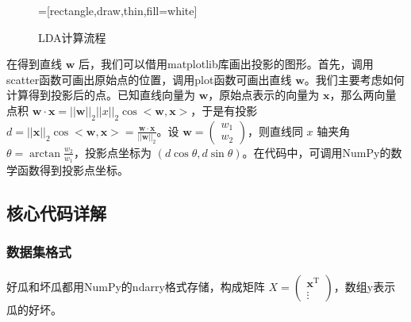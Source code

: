 \documentclass{ctexart}
\begin{document}
	\begin{figure}[htb]
		\centering
		\scriptsize  
		=[rectangle,draw,thin,fill=white]
		\caption{LDA计算流程}
		\label{LDA_Cal}
	\end{figure}  
	
	在得到直线 $\bm{w}$ 后，我们可以借用matplotlib库画出投影的图形。首先，调用scatter函数可画出原始点的位置，调用plot函数可画出直线 $\bm{w}$。我们主要考虑如何计算得到投影后的点。已知直线向量为 $\bm{w}$，原始点表示的向量为 $\bm{x}$，那么两向量点积 $\bm{w}\cdot\bm{x}=||\bm{w}||_2||x||_2\cos<\bm{w},\bm{x}>$，于是有投影 $d=||\bm{x}||_2\cos<\bm{w},\bm{x}>=\frac{\bm{w}\cdot\bm{x}}{||\bm{w}||_2}$。设 $\bm{w}=\begin{pmatrix}w_1\\w_2\end{pmatrix}$，则直线同 $x$ 轴夹角 $\theta=\arctan\frac{w_2}{w_1}$，投影点坐标为 $(d\cos\theta,d\sin\theta)$。在代码中，可调用NumPy的数学函数得到投影点坐标。
	
	\subsection{核心代码详解}
	\subsubsection{数据集格式}
	好瓜和坏瓜都用NumPy的ndarry格式存储，构成矩阵 $X=\begin{pmatrix}\bm{x}^\mathrm{T}\\\vdots\end{pmatrix}$，数组y表示瓜的好坏。\\
	
\end{document}
